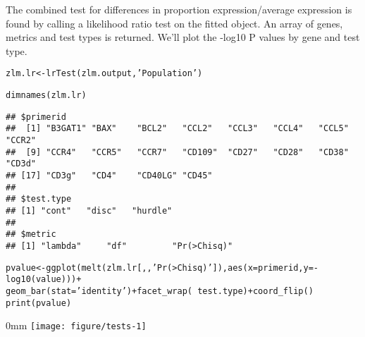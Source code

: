 \documentclass{article}\usepackage[]{graphicx}\usepackage[usenames,dvipsnames]{color}
\makeatletter
\def\maxwidth{ %
  \ifdim\Gin@nat@width>\linewidth
    \linewidth
  \else
    \Gin@nat@width
  \fi
}
\newcommand{\hlstr}[1]{\textcolor[rgb]{0.251,0.627,0.251}{#1}}%
\newcommand{\hlopt}[1]{\textcolor[rgb]{0,0,0}{#1}}%
\newcommand{\hlstd}[1]{\textcolor[rgb]{0.251,0.251,0.251}{#1}}%
\newcommand{\hlkwb}[1]{\textcolor[rgb]{0,0,0}{#1}}%
\newcommand{\hlkwc}[1]{\textcolor[rgb]{0.251,0.251,0.251}{#1}}%
\newcommand{\hlkwd}[1]{\textcolor[rgb]{0.878,0.439,0.125}{#1}}%
\newenvironment{knitrout}{}{} %
\makeatother
\begin{document}
The combined test for differences in proportion expression/average expression is found by calling a likelihood ratio test on the fitted object.
An array of genes, metrics and test types is returned.
We'll plot the -log10 P values by gene and test type.
\begin{knitrout}
\color{fgcolor}\begin{kframe}
\begin{alltt}
\hlstd{zlm.lr} \hlkwb{<-} \hlkwd{lrTest}\hlstd{(zlm.output,} \hlstr{'Population'}\hlstd{)}
\end{alltt}


{\ttfamily\noindent\itshape\color{messagecolor}{\#\# Refitting on reduced model...}}

{\ttfamily\noindent\itshape\color{messagecolor}{\#\# .\\\#\# Done!}}\begin{alltt}
\hlkwd{dimnames}\hlstd{(zlm.lr)}
\end{alltt}
\begin{verbatim}
## $primerid
##  [1] "B3GAT1" "BAX"    "BCL2"   "CCL2"   "CCL3"   "CCL4"   "CCL5"   "CCR2"  
##  [9] "CCR4"   "CCR5"   "CCR7"   "CD109"  "CD27"   "CD28"   "CD38"   "CD3d"  
## [17] "CD3g"   "CD4"    "CD40LG" "CD45"  
## 
## $test.type
## [1] "cont"   "disc"   "hurdle"
## 
## $metric
## [1] "lambda"     "df"         "Pr(>Chisq)"
\end{verbatim}
\begin{alltt}
\hlstd{pvalue} \hlkwb{<-} \hlkwd{ggplot}\hlstd{(}\hlkwd{melt}\hlstd{(zlm.lr[,,}\hlstr{'Pr(>Chisq)'}\hlstd{]),} \hlkwd{aes}\hlstd{(}\hlkwc{x}\hlstd{=primerid,} \hlkwc{y}\hlstd{=}\hlopt{-}\hlkwd{log10}\hlstd{(value)))}\hlopt{+}
    \hlkwd{geom_bar}\hlstd{(}\hlkwc{stat}\hlstd{=}\hlstr{'identity'}\hlstd{)}\hlopt{+}\hlkwd{facet_wrap}\hlstd{(}\hlopt{~}\hlstd{test.type)} \hlopt{+} \hlkwd{coord_flip}\hlstd{()}
\hlkwd{print}\hlstd{(pvalue)}
\end{alltt}
\end{kframe}\begin{adjustwidth}{\fltoffset}{0mm}
\texttt{[image: figure/tests-1]} \end{adjustwidth}
\end{knitrout}
\end{document}
